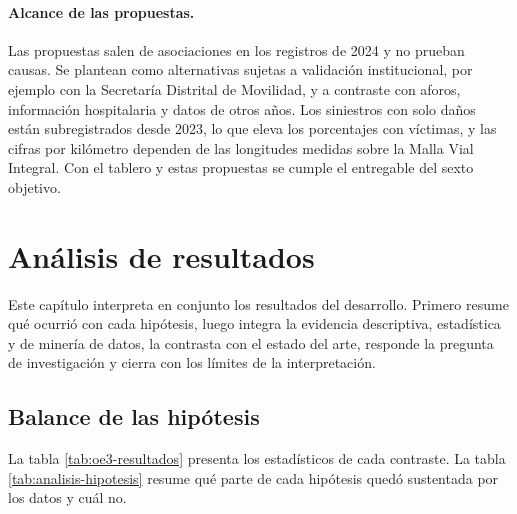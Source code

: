 \documentclass[12pt,letterpaper]{article}
\begin{document}
\paragraph{Alcance de las propuestas.}
Las propuestas salen de asociaciones en los registros de 2024 y no
prueban causas. Se plantean como alternativas sujetas a validación
institucional, por ejemplo con la Secretaría Distrital de Movilidad, y a
contraste con aforos, información hospitalaria y datos de otros años.
Los siniestros con solo daños están subregistrados desde 2023, lo que
eleva los porcentajes con víctimas, y las cifras por kilómetro dependen
de las longitudes medidas sobre la Malla Vial Integral. Con el tablero y estas
propuestas se cumple el entregable del sexto objetivo.

\clearpage

\section{Análisis de resultados}\label{analisis-de-resultados}

Este capítulo interpreta en conjunto los resultados del desarrollo.
Primero resume qué ocurrió con cada hipótesis, luego integra la
evidencia descriptiva, estadística y de minería de datos, la contrasta
con el estado del arte, responde la pregunta de investigación y cierra
con los límites de la interpretación.

\subsection{Balance de las hipótesis}

La tabla \ref{tab:oe3-resultados} presenta los estadísticos de cada
contraste. La tabla \ref{tab:analisis-hipotesis} resume qué parte de
cada hipótesis quedó sustentada por los datos y cuál no.
\end{document}
